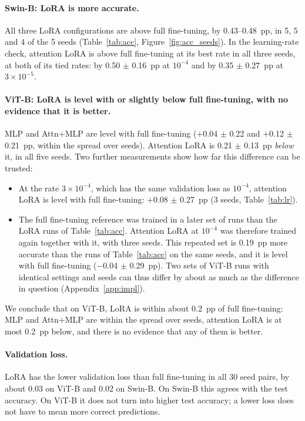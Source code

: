 \paragraph{Swin-B: LoRA is more accurate.} All three LoRA configurations are above full fine-tuning, by
0.43--0.48~pp, in 5, 5 and 4 of the 5 seeds (Table~\ref{tab:acc}, Figure~\ref{fig:acc_seeds}). In the learning-rate check, attention LoRA is above full fine-tuning at its best rate in
all three seeds, at both of its tied rates: by 0.50 $\pm$ 0.16~pp at $10^{-4}$ and by 0.35 $\pm$ 0.27~pp at
$3\times10^{-5}$.

\paragraph{ViT-B: LoRA is level with or slightly below full fine-tuning, with no evidence that it is better.} MLP and Attn+MLP are level with full
fine-tuning ($+$0.04 $\pm$ 0.22 and $+$0.12 $\pm$ 0.21~pp, within the spread over seeds). Attention LoRA is 0.21 $\pm$ 0.13~pp \emph{below}
it, in all five seeds. Two further measurements show how far this difference can
be trusted:
\begin{itemize}
  \item At the rate $3\times10^{-4}$, which has the same validation loss as $10^{-4}$, attention LoRA is level with
        full fine-tuning: $+$0.08 $\pm$ 0.27~pp (3 seeds, Table~\ref{tab:lr}).
  \item The full fine-tuning reference was trained in a later set of runs than the LoRA runs of
        Table~\ref{tab:acc}. Attention LoRA at $10^{-4}$ was therefore trained again together with it, with three
        seeds. This repeated set is 0.19~pp more accurate than the runs of Table~\ref{tab:acc} on the same seeds,
        and it is level with full fine-tuning ($-$0.04 $\pm$ 0.29~pp). Two sets of ViT-B runs with identical
        settings and seeds can thus differ by about as much as the difference in question
        (Appendix~\ref{app:impl}).
\end{itemize}
We conclude that on ViT-B, LoRA is within about 0.2~pp of full fine-tuning: MLP and Attn+MLP are within the spread
over seeds, attention LoRA is at most 0.2~pp below, and there is no evidence that any of them is better.

\paragraph{Validation loss.} LoRA has the lower validation loss than full fine-tuning in all 30 seed pairs, by about
0.03 on ViT-B and 0.02 on Swin-B. On Swin-B this agrees with the test accuracy. On ViT-B it does not turn into
higher test accuracy; a lower loss does not have to mean more correct predictions.

